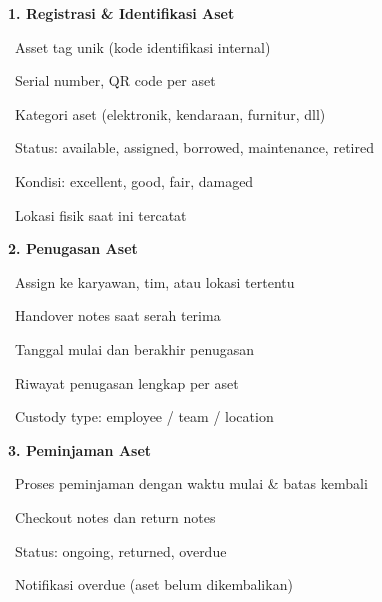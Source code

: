 \documentclass[a4paper]{article}
\begin{document}
\noindent
\begin{minipage}[t]{0.485\textwidth}

    {\fontsize{10.5}{13}\selectfont\bfseries\color{TealPrimary} 1. Registrasi \& Identifikasi Aset}
    \vspace{3pt}

    {\fontsize{9}{13}\selectfont\color{TextDark}%
    \textbullet\ Asset tag unik (kode identifikasi internal)\par\vspace{2pt}%
    \textbullet\ Serial number, QR code per aset\par\vspace{2pt}%
    \textbullet\ Kategori aset (elektronik, kendaraan, furnitur, dll)\par\vspace{2pt}%
    \textbullet\ Status: available, assigned, borrowed, maintenance, retired\par\vspace{2pt}%
    \textbullet\ Kondisi: excellent, good, fair, damaged\par\vspace{2pt}%
    \textbullet\ Lokasi fisik saat ini tercatat}%
    \vspace{8pt}

    {\fontsize{10.5}{13}\selectfont\bfseries\color{TealPrimary} 2. Penugasan Aset}
    \vspace{3pt}

    {\fontsize{9}{13}\selectfont\color{TextDark}%
    \textbullet\ Assign ke karyawan, tim, atau lokasi tertentu\par\vspace{2pt}%
    \textbullet\ Handover notes saat serah terima\par\vspace{2pt}%
    \textbullet\ Tanggal mulai dan berakhir penugasan\par\vspace{2pt}%
    \textbullet\ Riwayat penugasan lengkap per aset\par\vspace{2pt}%
    \textbullet\ Custody type: employee / team / location}%
    \vspace{8pt}

    {\fontsize{10.5}{13}\selectfont\bfseries\color{TealPrimary} 3. Peminjaman Aset}
    \vspace{3pt}

    {\fontsize{9}{13}\selectfont\color{TextDark}%
    \textbullet\ Proses peminjaman dengan waktu mulai \& batas kembali\par\vspace{2pt}%
    \textbullet\ Checkout notes dan return notes\par\vspace{2pt}%
    \textbullet\ Status: ongoing, returned, overdue\par\vspace{2pt}%
    \textbullet\ Notifikasi overdue (aset belum dikembalikan)}%

\end{minipage}%
\end{document}
